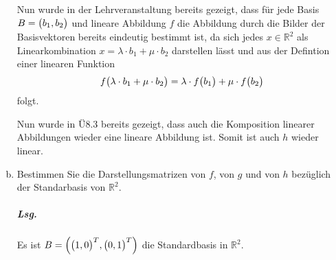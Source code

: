 \documentclass{scrreprt}
\begin{document}
\begin{enumerate}[(a)]
  Nun wurde in der Lehrveranstaltung bereits gezeigt, dass für jede Basis
  $B = \qty\big(b_1, b_2)$ und lineare Abbildung $f$ die Abbildung durch die
  Bilder der Basisvektoren bereits eindeutig bestimmt ist, da sich jedes
  $x \in \mathbb{R}^2$ als Linearkombination
  $x = \lambda \cdot b_1 + \mu \cdot b_2$ darstellen lässt und aus der Defintion
  einer linearen Funktion
  \[
    f\qty\big(\lambda \cdot b_1 + \mu \cdot b_2)
    = \lambda \cdot f\qty\big(b_1) + \mu \cdot f\qty\big(b_2)
  \]
  folgt.

  Nun wurde in Ü8.3 bereits gezeigt, dass auch die Komposition linearer Abbildungen
  wieder eine lineare Abbildung ist.
  Somit ist auch $h$ wieder linear.

\item Bestimmen Sie die Darstellungsmatrizen von $f$, von $g$ und von $h$
  bezüglich der Standarbasis von $\mathbb{R}^2$.

  \subparagraph{Lsg.} Es ist $B = \qty(\qty\big(1, 0)^T, \qty\big(0, 1)^T)$ die
  Standardbasis in $\mathbb{R}^2$.


\end{enumerate}
\end{document}
